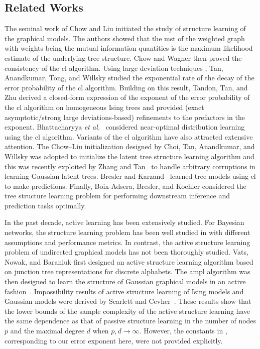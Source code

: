 \documentclass[11pt,onecolumn]{article}
\begin{document}
\subsection{Related Works}
The seminal work of Chow and Liu\cite{chow1968approximating} initiated the study of   structure learning of the graphical models. The authors showed that the \ac{mst} of the weighted  graph with weights being the  mutual information quantities is the maximum likelihood estimate of the underlying tree structure. Chow and Wagner  \cite{chow1973consistency} then proved the consistency of the \ac{cl} algorithm. Using large deviation techniques \cite{zeitouni1998large}, Tan, Anandkumar, Tong, and Willsky\cite{tan2011large} studied the exponential rate of the decay of the error probability of the \ac{cl} algorithm. Building on this result, Tandon, Tan, and Zhu\cite{tandon2020exact} derived a closed-form expression of the exponent of the error probability of the \ac{cl} algorithm on homogeneous Ising trees and provided (exact asymptotic/strong large deviations-based) refinements to the prefactors in the exponent. Bhattacharyya {\em et al.}~\cite{bha21} considered near-optimal distribution learning using the \ac{cl} algorithm. Variants of the \ac{cl} algorithm have also attracted extensive attention. The Chow--Liu initialization designed by Choi, Tan, Anandkumar, and Willsky \cite{choi2011learning} was adopted to initialize the latent tree structure learning algorithm and this was recently exploited by Zhang and Tan~\cite{zhang21} to handle arbitrary corruptions in learning Gaussian latent trees.  Bresler and Karzand~\cite{bresler2020learning} learned tree models using \ac{cl} to make predictions. Finally,  Boix-Adsera, Bresler, and Koehler\cite{boix2021chow} considered the tree structure learning problem for performing downstream inference  and prediction tasks optimally.

In the past decade, active learning has been extensively studied\cite{hanneke2009theoretical,naghshvar2013active}. For Bayesian networks,  the structure learning problem has been well studied in \cite{tong2001active, he2008active, li2009active, squires2020active, ben2021active} with different assumptions and performance metrics. In contrast, the active structure learning problem of undirected graphical models has not been thoroughly studied. Vats, Nowak, and Baraniuk\cite{vats2014active} first designed an active structure learning algorithm based on junction tree representations for discrete alphabets. The \ac{ampl} algorithm was then designed to learn the structure of Gaussian graphical models in an active fashion~\cite{dasarathy2016active}. Impossibility results of active structure learning of Ising models and Gaussian models were derived by Scarlett and Cevher~\cite{scarlett2017lower}. These results  show  that the lower bounds of the sample complexity of the active structure learning have the same dependence as that of   passive structure learning in the number of nodes $p$ and the maximal degree $d$ when $p,d\rightarrow\infty$. However, the constants in \cite{scarlett2017lower}, corresponding to our error exponent here,  were not provided explicitly. 
\end{document}
